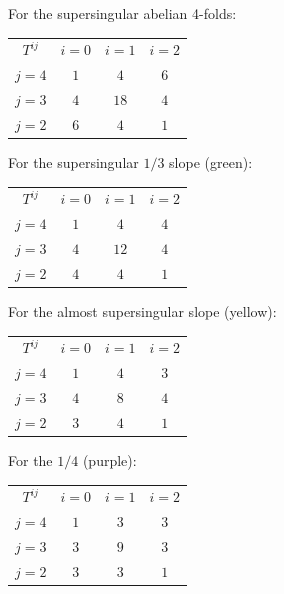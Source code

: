 \documentclass[a4paper,12pt,twoside]{report}
\begin{document}
For the supersingular abelian 4-folds: 

\begin{center}
    \begin{tabular}{ c|c|c|c } 
     $T^{ij}$             &   $i=0$  & $i=1$  & $i=2$   \\ 
     $j=4$                &    $1$   &   $4$  &  $6$    \\ 
     $j=3$                &    $4$   &   $18$ &  $4$    \\           
     $j=2$                &    $6$   &   $4$  &  $1$    \\          
    \end{tabular}
\end{center}

For the supersingular $1/3$ slope (green): 

\begin{center}
    \begin{tabular}{ c|c|c|c } 
     $T^{ij}$             &   $i=0$  & $i=1$  & $i=2$   \\ 
     $j=4$                &    $1$   &   $4$  &  $4$    \\ 
     $j=3$                &    $4$   &   $12$  &  $4$    \\           
     $j=2$                &    $4$   &   $4$  &  $1$    \\          
    \end{tabular}
\end{center}

For the almost supersingular slope (yellow): 

\begin{center}
    \begin{tabular}{ c|c|c|c } 
     $T^{ij}$             &   $i=0$  & $i=1$  & $i=2$   \\ 
     $j=4$                &    $1$   &   $4$  &  $3$    \\ 
     $j=3$                &    $4$   &   $8$  &  $4$    \\           
     $j=2$                &    $3$   &   $4$  &  $1$    \\          
    \end{tabular}
\end{center}

For the $1/4$ (purple): 

\begin{center}
    \begin{tabular}{ c|c|c|c } 
     $T^{ij}$             &   $i=0$  & $i=1$  & $i=2$   \\ 
     $j=4$                &    $1$   &   $3$  &  $3$    \\ 
     $j=3$                &    $3$   &   $9$  &  $3$    \\           
     $j=2$                &    $3$   &   $3$  &  $1$    \\          
    \end{tabular}
\end{center}
\end{document}
